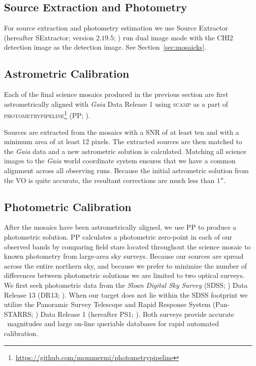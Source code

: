 \documentclass[apj, revtex4-1]{emulateapj}
\begin{document}

\subsection{Source Extraction and Photometry}\label{sec:sextractor}
For source extraction and photometry estimation we use Source Extractor (hereafter SExtractor; version $2.19.5$; \citealt{Bertin1996}) run dual image mode with the CHI2 detection image as the detection image. See Section~\ref{sec:mosaicks}.


\subsection{Astrometric Calibration}
Each of the final science mosaics produced in the previous section are first astrometrically aligned with \textit{Gaia} \citep{GaiaCollaboration2016} Data Release 1 \citep{GaiaCollaboration2016a} using \textsc{scamp} \citep{Bertin2006} as a part of \textsc{photometrypipeline}\footnote{\url{https://github.com/mommermi/photometrypipeline}} (PP; \citealt{Mommert2017}).

Sources are extracted from the mosaics with a SNR of at least ten and with a minimum area of at least 12 pixels. The extracted sources are then matched to the \textit{Gaia} data and a new astrometric solution is calculated. Matching all science images to the \textit{Gaia} world coordinate system ensures that we have a common alignment across all observing runs. Because the initial astrometric solution from the VO is quite accurate, the resultant corrections are much less than $1''$.

\subsection{Photometric Calibration}
After the mosaics have been astrometrically aligned, we use PP to produce a photometric solution. PP calculates a photometric zero-point in each of our observed bands by comparing field stars located throughout the science mosaic to known photometry from large-area sky surveys. Because our sources are spread across the entire northern sky, and because we prefer to minimize the number of differences between photometric solutions we are limited to two optical surveys. We first seek photometric data from the \textit{Sloan Digital Sky Survey} (SDSS; \citealt{York2000}) Data Release 13 (DR13; \citealt{Albareti2017}). When our target does not lie within the SDSS footprint we utilize the Panoramic Survey Telescope and Rapid Response System (Pan-STARRS; \citealt{Chambers2016}) Data Release 1 (hereafter PS1; \citealt{Flewelling2016}). Both surveys provide accurate \sdssg\sdssr\sdssi\sdssz\ magnitudes and large on-line queriable databases for rapid automated calibration.
\end{document}
